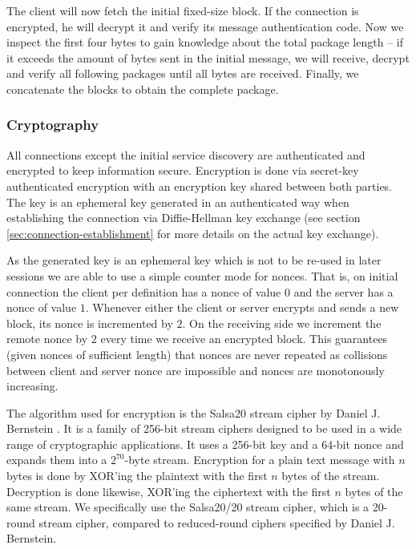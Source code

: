 The client will now fetch the initial fixed-size block.
If the connection is encrypted, he will decrypt it and verify its message authentication code.
Now we inspect the first four bytes to gain knowledge about the total package length -- if it exceeds the amount of bytes sent in the initial message, we will receive, decrypt and verify all following packages until all bytes are received.
Finally, we concatenate the blocks to obtain the complete package.

\subsubsection{Cryptography}

All connections except the initial service discovery are authenticated and encrypted to keep information secure.
Encryption is done via secret-key authenticated encryption with an encryption key shared between both parties.
The key is an ephemeral key generated in an authenticated way when establishing the connection via Diffie-Hellman key exchange (see section \ref{sec:connection-establishment} for more details on the actual key exchange).

As the generated key is an ephemeral key which is not to be re-used in later sessions we are able to use a simple counter mode for nonces.
That is, on initial connection the client per definition has a nonce of value $0$ and the server has a nonce of value $1$.
Whenever either the client or server encrypts and sends a new block, its nonce is incremented by $2$.
On the receiving side we increment the remote nonce by $2$ every time we receive an encrypted block.
This guarantees (given nonces of sufficient length) that nonces are never repeated as collisions between client and server nonce are impossible and nonces are monotonously increasing.

The algorithm used for encryption is the Salsa20 stream cipher by Daniel J. Bernstein \cite{bernstein2008salsa}.
It is a family of 256-bit stream ciphers designed to be used in a wide range of cryptographic applications.
It uses a 256-bit key and a 64-bit nonce and expands them into a $2^{70}$-byte stream.
Encryption for a plain text message with $n$ bytes is done by XOR'ing the plaintext with the first $n$ bytes of the stream.
Decryption is done likewise, XOR'ing the ciphertext with the first $n$ bytes of the same stream.
We specifically use the Salsa20/20 stream cipher, which is a 20-round stream cipher, compared to reduced-round ciphers specified by Daniel J. Bernstein.

